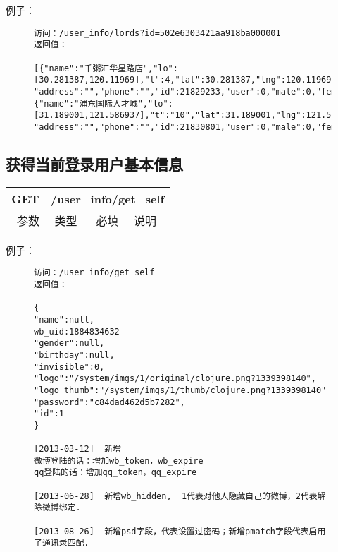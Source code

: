 例子：

\begin{figure}[H]
\begin{verbatim}
访问：/user_info/lords?id=502e6303421aa918ba000001
返回值：

[{"name":"千粥汇华星路店","lo":[30.281387,120.11969],"t":4,"lat":30.281387,"lng":120.11969,
"address":"","phone":"","id":21829233,"user":0,"male":0,"female":0},
{"name":"浦东国际人才城","lo":[31.189001,121.586937],"t":"10","lat":31.189001,"lng":121.586937,
"address":"","phone":"","id":21830801,"user":0,"male":0,"female":0}]

\end{verbatim}
\end{figure}


\subsection{获得当前登录用户基本信息}

\begin{table}[H]
   \begin{center}
\begin{tabular}{|c|c|c|p{12cm}|}
\hline
GET & \multicolumn{3}{|c|}{/user\_info/get\_self} \\
\hline\hline
 \  参数  & 类型 & 必填 &  说明  \\
\hline
\end{tabular}
   \end{center}
\end{table}

例子：

\begin{figure}[H]
\begin{verbatim}
访问：/user_info/get_self
返回值：

{
"name":null,
wb_uid:1884834632
"gender":null,
"birthday":null,
"invisible":0,
"logo":"/system/imgs/1/original/clojure.png?1339398140",
"logo_thumb":"/system/imgs/1/thumb/clojure.png?1339398140"
"password":"c84dad462d5b7282",
"id":1
}

[2013-03-12]  新增
微博登陆的话：增加wb_token，wb_expire
qq登陆的话：增加qq_token，qq_expire

[2013-06-28]  新增wb_hidden,  1代表对他人隐藏自己的微博，2代表解除微博绑定.

[2013-08-26]  新增psd字段，代表设置过密码；新增pmatch字段代表启用了通讯录匹配.

\end{verbatim}
\end{figure}




